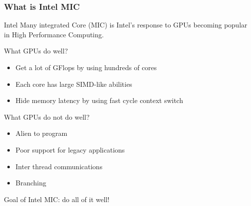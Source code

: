 \documentclass{beamer}
\newcommand{\MIC}{Intel MIC\xspace}
\begin{document}
\begin{frame}
  \frametitle{What is Intel MIC}
  Intel Many integrated Core (MIC) is Intel's response to GPUs
  becoming popular in High Performance Computing.
  
  \begin{block}{What GPUs do well?}
    \begin{itemize}
      \item Get a lot of GFlops by using hundreds of cores
      \item Each core has large SIMD-like abilities
      \item Hide memory latency by using fast cycle context switch
    \end{itemize}
  \end{block}


  \begin{block}{What GPUs do not do well?}
    \begin{itemize}
      \item Alien to program
      \item Poor support for legacy applications
      \item Inter thread communications
      \item Branching
    \end{itemize}
  \end{block}

  Goal of \MIC : do all of it well!
\end{frame}
\end{document}
